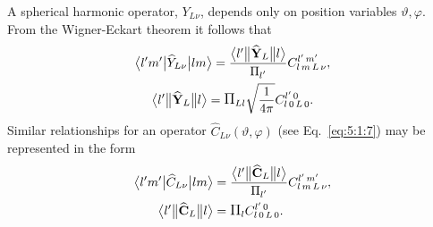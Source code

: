 A spherical harmonic operator, \(Y_{L \nu}\), depends only on position variables \(\vartheta, \varphi\). From the Wigner-Eckart theorem it follows that
\begin{gather}
\braOket{ l^{\prime} m^{\prime}}{ \widehat{Y}_{L \nu}}{l m}=\frac{
\braOketred{ l^{\prime}}{\widehat{\vect{Y}}_{L}}{ l}}{\Fact{l^{\prime}}}
\clebsch{l}{m}{L}{\nu}{l^{\prime}}{m^{\prime}},  \label{eq:13:2:104}\\
\braOketred{ l^{\prime}}{\widehat{\vect{Y}}_{L}}{ l}=\Fact{L l}\sqrt{\frac{1}{4 \pi}} 
\clebsch{l}{0}{L}{0}{l^{\prime}}{0}. \label{eq:13:2:105}
\end{gather}
Similar relationships for an operator \(\widehat{C}_{L \nu}(\vartheta, \varphi)\) (see Eq.~\eqref{eq:5:1:7}) may be represented in the form
\begin{align}
\braOket{ l^{\prime} m^{\prime}}{ \widehat{C}_{L \nu}}{l m} & =\frac{
\braOketred{ l^{\prime}}{\widehat{\vect{C}}_{L}}{ l}}{\Fact{l^{\prime}}} 
\clebsch{l}{m}{L}{\nu}{l^{\prime}}{m^{\prime}},  \label{eq:13:2:106}\\
\braOketred{ l^{\prime}}{\widehat{\vect{C}}_{L}}{ l} & =\Fact{l}
\clebsch{l}{0}{L}{0}{l^{\prime}}{0}. \label{eq:13:2:107}
\end{align}

